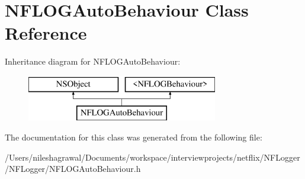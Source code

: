 \hypertarget{interface_n_f_l_o_g_auto_behaviour}{}\section{N\+F\+L\+O\+G\+Auto\+Behaviour Class Reference}
\label{interface_n_f_l_o_g_auto_behaviour}
Inheritance diagram for N\+F\+L\+O\+G\+Auto\+Behaviour\+:\begin{figure}[H]
\begin{center}
\leavevmode
\includegraphics[height=2.000000cm]{interface_n_f_l_o_g_auto_behaviour}
\end{center}
\end{figure}


The documentation for this class was generated from the following file\+:\begin{DoxyCompactItemize}
\item 
/\+Users/nileshagrawal/\+Documents/workspace/interviewprojects/netflix/\+N\+F\+Logger/\+N\+F\+Logger/N\+F\+L\+O\+G\+Auto\+Behaviour.\+h\end{DoxyCompactItemize}
